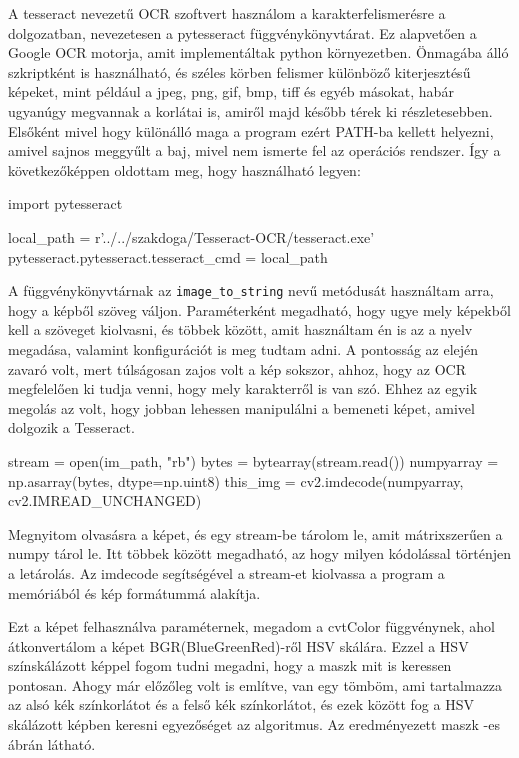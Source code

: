 A tesseract nevezetű OCR szoftvert használom a karakterfelismerésre a dolgozatban, nevezetesen a pytesseract függvénykönyvtárat. Ez alapvetően a Google OCR motorja, amit implementáltak python környezetben. Önmagába álló szkriptként is használható, és széles körben felismer különböző kiterjesztésű képeket, mint például a jpeg, png, gif, bmp, tiff és egyéb másokat, habár ugyanúgy megvannak a korlátai is, amiről majd később térek ki részletesebben. Elsőként mivel hogy különálló maga a program ezért PATH-ba kellett helyezni, amivel sajnos meggyűlt a baj, mivel nem ismerte fel az operációs rendszer. Így a következőképpen oldottam meg, hogy használható legyen:
\begin{python}
import pytesseract

local_path = r'../../szakdoga/Tesseract-OCR/tesseract.exe'
pytesseract.pytesseract.tesseract_cmd = local_path
\end{python}
A függvénykönyvtárnak az \texttt{image\_to\_string} nevű metódusát használtam arra, hogy a képből szöveg váljon. Paraméterként megadható, hogy ugye mely képekből kell a szöveget kiolvasni, és többek között, amit használtam én is az a nyelv megadása, valamint konfigurációt is meg tudtam adni. A pontosság az elején zavaró volt, mert túlságosan zajos volt a kép sokszor, ahhoz, hogy az OCR megfelelően ki tudja venni, hogy mely karakterről is van szó. Ehhez az egyik megolás az volt, hogy jobban lehessen manipulálni a bemeneti képet, amivel dolgozik a Tesseract.



\begin{python}
stream = open(im_path, "rb")
bytes = bytearray(stream.read())
numpyarray = np.asarray(bytes, dtype=np.uint8)
this_img = cv2.imdecode(numpyarray, cv2.IMREAD_UNCHANGED)
\end{python}
Megnyitom olvasásra a képet, és egy stream-be tárolom le, amit mátrixszerűen a numpy tárol le. Itt többek között megadható, az hogy milyen kódolással történjen a letárolás. Az imdecode segítségével a stream-et kiolvassa a program a memóriából és kép formátummá alakítja.

Ezt a képet felhasználva paraméternek, megadom a cvtColor függvénynek, ahol átkonvertálom a képet BGR(BlueGreenRed)-ről HSV skálára. Ezzel a HSV színskálázott képpel fogom tudni megadni, hogy a maszk mit is keressen pontosan. Ahogy már előzőleg volt is említve, van egy tömböm, ami tartalmazza az alsó kék színkorlátot és a felső kék színkorlátot, és ezek között fog a HSV skálázott képben keresni egyezőséget az algoritmus. Az eredményezett maszk -es ábrán látható. 

